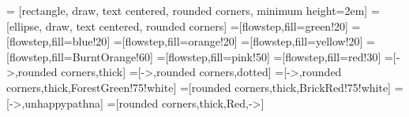 \documentclass[../../presentation.tex]{subfiles}
\begin{document}
 = [rectangle, draw, text centered, rounded corners, minimum height=2em]
 = [ellipse, draw, text centered, rounded corners]
=[flowstep,fill=green!20]
=[flowstep,fill=blue!20]
=[flowstep,fill=orange!20]
=[flowstep,fill=yellow!20]
=[flowstep,fill=BurntOrange!60]
=[flowstep,fill=pink!50]
=[flowstep,fill=red!30]
=[->,rounded corners,thick]
=[->,rounded corners,dotted]
=[->,rounded corners,thick,ForestGreen!75!white]
=[rounded corners,thick,BrickRed!75!white]
=[->,unhappypathna]
=[rounded corners,thick,Red,->]

\end{document}
